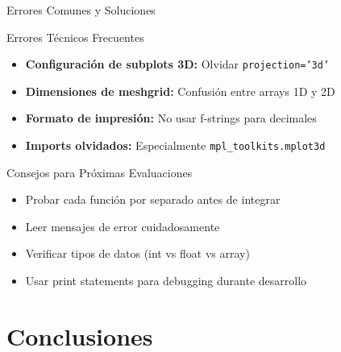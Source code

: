 \documentclass[10pt]{beamer}
\begin{document}
\begin{frame}{Errores Comunes y Soluciones}
  \begin{block}{Errores Técnicos Frecuentes}
    \begin{itemize}
      \item \textbf{Configuración de subplots 3D:} Olvidar \texttt{projection='3d'}
      \item \textbf{Dimensiones de meshgrid:} Confusión entre arrays 1D y 2D
      \item \textbf{Formato de impresión:} No usar f-strings para decimales
      \item \textbf{Imports olvidados:} Especialmente \texttt{mpl\_toolkits.mplot3d}
    \end{itemize}
  \end{block}
  
  \begin{alertblock}{Consejos para Próximas Evaluaciones}
    \begin{itemize}
      \item Probar cada función por separado antes de integrar
      \item Leer mensajes de error cuidadosamente
      \item Verificar tipos de datos (int vs float vs array)
      \item Usar print statements para debugging durante desarrollo
    \end{itemize}
  \end{alertblock}
\end{frame}

\section{Conclusiones}
\end{document}

